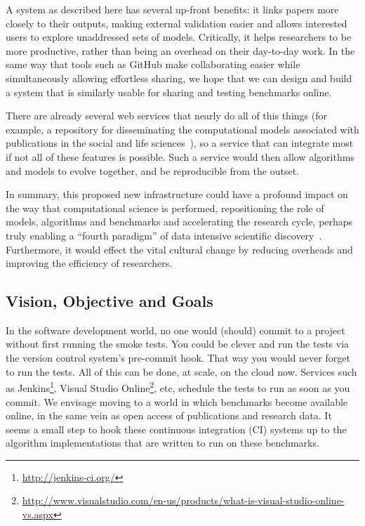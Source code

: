 \documentclass[a4paper,11pt]{article}
\begin{document}
A system as described here has several up-front benefits: it links
papers more closely to their outputs, making external validation
easier and allows interested users to explore unaddressed sets of
models. Critically, it helps researchers to be more productive, rather
than being an overhead on their day-to-day work. In the same way that
tools such as GitHub make collaborating easier while simultaneously
allowing effortless sharing, we hope that we can design and build a
system that is similarly usable for sharing and testing benchmarks
online.

There are already several web services that nearly do all of this
things (for example, a repository for disseminating the computational
models associated with publications in the social and life
sciences~\cite{rollins-et-al:2014}), so a service that can integrate
most if not all of these features is possible. Such a service would
then allow algorithms and models to evolve together, and be
reproducible from the outset.

In summary, this proposed new infrastructure could have a profound
impact on the way that computational science is performed,
repositioning the role of models, algorithms and benchmarks and
accelerating the research cycle, perhaps truly enabling a ``fourth
paradigm'' of data intensive scientific
discovery~\cite{hey:2009}. Furthermore, it would effect the vital
cultural change by reducing overheads and improving the efficiency of
researchers.

\subsection{Vision, Objective and Goals}

In the software development world, no one would (should) commit to a
project without first running the smoke tests. You could be clever and
run the tests via the version control system's pre-commit hook. That
way you would never forget to run the tests. All of this can be done,
at scale, on the cloud now. Services such as
Jenkins\footnote{\url{http://jenkins-ci.org/}}, Visual Studio
Online\footnote{\url{http://www.visualstudio.com/en-us/products/what-is-visual-studio-online-vs.aspx}},
etc, schedule the tests to run as soon as you commit. We envisage
moving to a world in which benchmarks become available online, in the
same vein as open access of publications and research data. It seems a
small step to hook these continuous integration (CI) systems up to the
algorithm implementations that are written to run on these benchmarks.
\end{document}
